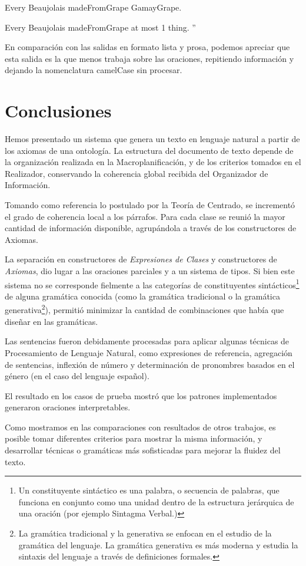 Every Beaujolais madeFromGrape GamayGrape.

Every Beaujolais madeFromGrape at most 1 thing.
''

En comparación con las salidas en formato lista y prosa, podemos apreciar que esta salida es la que menos trabaja sobre las oraciones, repitiendo información y dejando la nomenclatura camelCase sin procesar.

\section{Conclusiones}
Hemos presentado un sistema que genera un texto en lenguaje natural a partir de los axiomas de una ontología. La estructura del documento de texto depende de la organización realizada en la Macroplanificación, y de los criterios tomados en el Realizador, conservando la coherencia global recibida del Organizador de Información. 

Tomando como referencia lo postulado por la Teoría de Centrado,%
se incrementó el grado de coherencia local a los párrafos. Para cada clase se reunió la mayor cantidad de información disponible, agrupándola a través de los constructores de Axiomas.

La separación en constructores de \textit{Expresiones de Clases} y constructores de \textit{Axiomas}, dio lugar a las oraciones parciales y a un sistema de tipos. Si bien este sistema no se corresponde fielmente a las categorías de constituyentes sintácticos\footnote{Un constituyente sintáctico es una palabra, o secuencia de palabras, que funciona en conjunto como una unidad dentro de la estructura jerárquica de una oración (por ejemplo Sintagma Verbal.)} de alguna gramática conocida (como la gramática tradicional o la gramática generativa\footnote{La gramática tradicional y la generativa se enfocan en el estudio de la gramática del lenguaje. La gramática generativa es más moderna y estudia la sintaxis del lenguaje a través de definiciones formales.}), permitió minimizar la cantidad de combinaciones que había que diseñar en las gramáticas.

Las sentencias fueron debidamente procesadas para aplicar algunas técnicas de Procesamiento de Lenguaje Natural, como expresiones de referencia, agregación de sentencias, inflexión de número y determinación de pronombres basados en el género (en el caso del lenguaje español). 

El resultado en los casos de prueba mostró que los patrones implementados generaron oraciones interpretables.

Como mostramos en las comparaciones con resultados de otros trabajos, es posible tomar diferentes criterios para mostrar la misma información, y desarrollar técnicas o gramáticas más sofisticadas para mejorar la fluidez del texto.